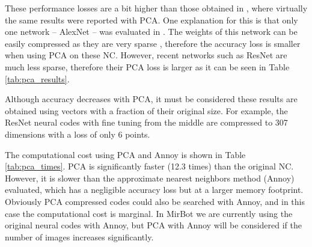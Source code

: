 \documentclass[final, twocolumn]{elsarticle}
\begin{document}
These performance losses are a bit higher than those obtained in \cite{BabenkoSCL14}, where virtually the same results were reported with PCA. One explanation for this is that only one network -- AlexNet \cite{Krizhevsky2012ImageNetNetworks} -- was evaluated in \cite{BabenkoSCL14}. The weights of this network can be easily compressed as they are very sparse \cite{Sparse}, therefore  the accuracy loss is smaller when using PCA on these NC. However, recent networks such as ResNet are much less sparse, therefore their PCA loss is larger as it can be seen in Table \ref{tab:pca_results}. 

Although accuracy decreases with PCA, it must be considered these results are obtained using vectors with a fraction of their original size. For example, the ResNet neural codes with fine tuning from the middle are compressed to 307 dimensions with a loss of only 6 points.

The computational cost using PCA and Annoy is shown in Table \ref{tab:pca_times}. PCA is significantly faster (12.3 times) than the original NC. However, it is slower than the approximate nearest neighbors method (Annoy) evaluated, which has a negligible accuracy loss but at a larger memory footprint. Obviously PCA compressed codes could also be searched with Annoy, and in this case the computational cost is marginal. In MirBot we are currently using the original neural codes with Annoy, but PCA with Annoy will be considered if the number of images increases significantly. %
\end{document}
